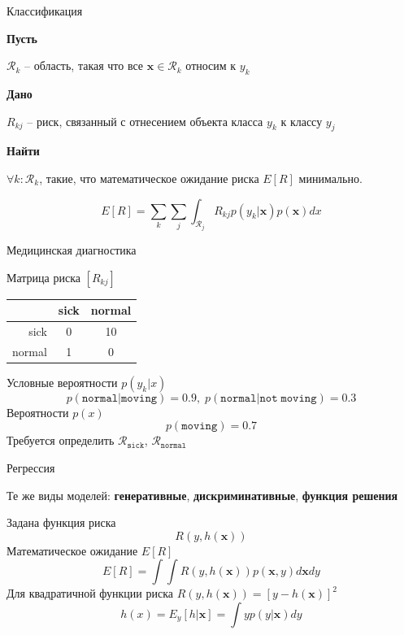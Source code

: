 \documentclass[10pt]{beamer}
\begin{document}
\begin{frame}{Классификация}

{\bf Пусть}

$\mathcal{R}_k$ -- область, такая что все $\mathbf{x} \in \mathcal{R}_k$ относим к $y_k$

{\bf Дано}

$R_{kj}$ -- риск, связанный с отнесением объекта класса $y_k$ к классу $y_j$

{\bf Найти}

$\forall k: \mathcal{R}_k$, такие, что математическое ожидание риска $E[R]$ минимально.

\[
E[R] = \sum_k \sum_j \int_{\mathcal{R}_j} R_{kj} p(y_k | \mathbf{x}) p(\mathbf{x}) dx
\]

\end{frame}

\begin{frame}{Медицинская диагностика}

Матрица риска $[R_{kj}]$

\begin{center}
\begin{tabular}{r | c c}
 & sick & normal \\
\hline
sick & 0 & 10 \\
normal & 1 & 0 
\end{tabular}
\end{center}

Условные вероятности $p(y_k | x)$
\[ 
p(\mathtt{normal} | \mathtt{moving}) = 0.9, \; p(\mathtt{normal} | {\mathtt{not\;moving}}) = 0.3
\]
Вероятности $p(x)$
\[
p(\mathtt{moving}) = 0.7
\]
Требуется определить $\mathcal{R}_{\mathtt{sick}}$, $\mathcal{R}_{\mathtt{normal}}$

\end{frame}

\begin{frame}{Регрессия}

Те же виды моделей: {\bf генеративные}, {\bf дискриминативные}, {\bf функция решения}
\vspace{1em}

Задана функция риска
\[
R(y, h(\mathbf{x}))
\]
Математическое ожидание $E[R]$
\[
E[R] = \int \!\! \int R(y, h(\mathbf{x})) p(\mathbf{x}, y) d\mathbf{x} dy
\]
Для квадратичной функции риска $R(y, h(\mathbf{x})) = [y - h(\mathbf{x})]^2$
\[
h(x) = E_y[h | \mathbf{x}] = \int y p(y | \mathbf{x}) dy
\]

\end{frame}

\end{document}
